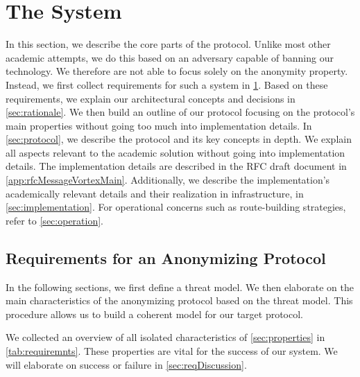 

\part{The \MessageVortex{} System}\label{sec:coreMVProtocol}
In this section, we describe the core parts of the \MessageVortex{} protocol. Unlike most other academic attempts, we do this based on an adversary capable of banning our technology. We therefore are not able to focus solely on the anonymity property. Instead, we first collect requirements for such a system in \cref{sec:genRequirements}. Based on these requirements, we explain our architectural concepts and decisions in \cref{sec:rationale}. We then build an outline of our protocol focusing on the protocol's main properties without going too much into implementation details. In \cref{sec:protocol}, we describe the protocol and its key concepts in depth. We explain all aspects relevant to the academic solution without going into implementation details. The implementation details are described in the RFC draft document in \cref{app:rfcMessageVortexMain}. Additionally, we describe the implementation's academically relevant details and their realization in infrastructure, in \cref{sec:implementation}. For operational concerns such as route-building strategies, refer to \cref{sec:operation}.

\chapter{Requirements for an Anonymizing Protocol}\label{sec:genRequirements}
In the following sections, we first define a threat model. We then elaborate on the main characteristics of the anonymizing protocol based on the threat model. This procedure allows us to build a coherent model for our target protocol.

We collected an overview of all isolated characteristics of \cref{sec:properties} in \cref{tab:requiremnts}. These properties are vital for the success of our system. We will elaborate on success or failure in \cref{sec:reqDiscussion}.

